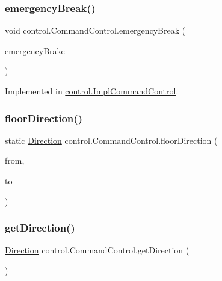 \subsubsection{\texorpdfstring{emergencyBreak()}{emergencyBreak()}}
{\footnotesize\ttfamily void control.\+Command\+Control.\+emergency\+Break (\begin{DoxyParamCaption}\item[{\mbox{\hyperlink{classcontrol_1_1command_1_1_emergency_brake}{Emergency\+Brake}}}]{emergency\+Brake }\end{DoxyParamCaption})}



Implemented in \mbox{\hyperlink{classcontrol_1_1_impl_command_control_a1a3e2202d967016c70f6c7e2105fc4c7}{control.\+Impl\+Command\+Control}}.

\mbox{\label{interfacecontrol_1_1_command_control_a22ab7945cd82bb103b59e5d3103288a3}} 
\subsubsection{\texorpdfstring{floorDirection()}{floorDirection()}}
{\footnotesize\ttfamily static \mbox{\hyperlink{enumcontrol_1_1command_1_1_direction}{Direction}} control.\+Command\+Control.\+floor\+Direction (\begin{DoxyParamCaption}\item[{int}]{from,  }\item[{int}]{to }\end{DoxyParamCaption})\hspace{0.3cm}{\ttfamily [static]}}

\mbox{\label{interfacecontrol_1_1_command_control_af668873aadd297c71867fa707b5ecd55}} 
\subsubsection{\texorpdfstring{getDirection()}{getDirection()}}
{\footnotesize\ttfamily \mbox{\hyperlink{enumcontrol_1_1command_1_1_direction}{Direction}} control.\+Command\+Control.\+get\+Direction (\begin{DoxyParamCaption}{ }\end{DoxyParamCaption})}




